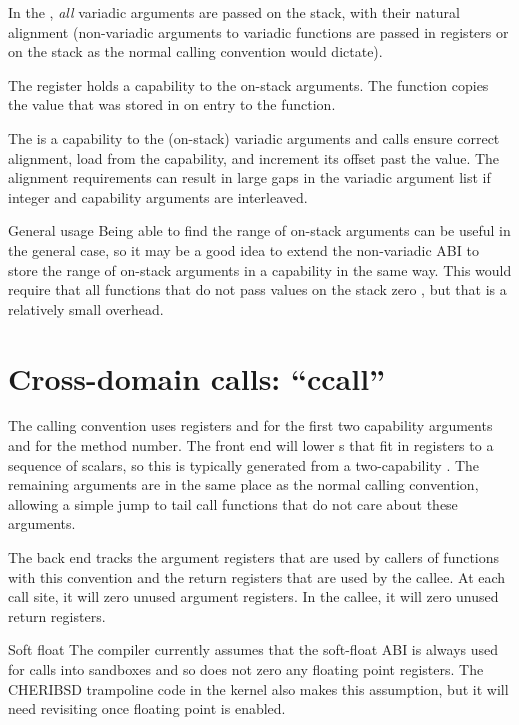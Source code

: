 In the \sandboxABI{}, \textit{all} variadic arguments are passed on the stack, with their natural alignment (non-variadic arguments to variadic functions are passed in registers or on the stack as the normal calling convention would dictate).

The  register holds a capability to the on-stack arguments.
The  function copies the value that was stored in  on entry to the function.

The  is a capability to the (on-stack) variadic arguments and  calls ensure correct alignment, load from the capability, and increment its offset past the value.
The alignment requirements can result in large gaps in the variadic argument list if integer and capability arguments are interleaved.

\begin{notebox}{General usage}
	Being able to find the range of on-stack arguments can be useful in the general case, so it may be a good idea to extend the non-variadic ABI to store the range of on-stack arguments in a capability in the same way.
	This would require that all functions that do not pass values on the stack zero , but that is a relatively small overhead.
\end{notebox}

\section{Cross-domain calls: ``ccall''}

The  calling convention uses registers  and  for the first two capability arguments and  for the method number.
The front end will lower s that fit in registers to a sequence of scalars, so this is typically generated from a two-capability .
The remaining arguments are in the same place as the normal calling convention, allowing a simple jump to tail call functions that do not care about these arguments.

The back end tracks the argument registers that are used by callers of functions with this convention and the return registers that are used by the callee.
At each call site, it will zero unused argument registers.
In the callee, it will zero unused return registers.

\begin{notebox}{Soft float}
	The compiler currently assumes that the soft-float ABI is always used for calls into sandboxes and so does not zero any floating point registers.
	The CHERIBSD trampoline code in the kernel also makes this assumption, but it will need revisiting once floating point is enabled.
\end{notebox}

